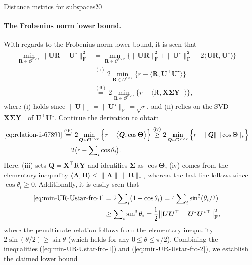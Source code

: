 \documentclass{article}
\begin{document}
\begin{problem}{Distance metrics for subspaces}{20}
{\paragraph{The Frobenius norm lower bound.}

With regards to the Frobenius norm lower bound, it is seen that
%
\begin{align}
\min_{\bm{R}\in\mathcal{O}^{r\times r}}\big\|\bm{U}\bm{R}-\bm{U}^{\star}\big\|_{\mathrm{F}}^{2} & =\min_{\bm{R}\in\mathcal{O}^{r\times r}}\Big\{\|\bm{U}\bm{R}\|_{\mathrm{F}}^{2}+\|\bm{U}^{\star}\|_{\mathrm{F}}^{2}-2\big\langle\bm{U}\bm{R},\bm{U}^{\star}\big\rangle\Big\}\nonumber \\
 & \overset{(\mathrm{i})}{=} 2\min_{\bm{R}\in\mathcal{O}^{r\times r}}\Big\{ r-\big\langle\bm{R},\bm{U}^{\top}\bm{U}^{\star}\big\rangle\Big\}\nonumber \\
 & \overset{(\mathrm{ii})}{=} 2\min_{\bm{R}\in\mathcal{O}^{r\times r}}\Big\{ r-\big\langle\bm{R},\bm{X}\bm{\Sigma}\bm{Y}^{\top}\big\rangle\Big\} ,
	\label{eq:relation-ii-67890}
\end{align}
%
where (i) holds since $\|\bm{U}\|_{\mathrm{F}}=\|\bm{U}^{\star}\|_{\mathrm{F}}=\sqrt{r}$,
and (ii) relies on the SVD $\bm{X}\bm{\Sigma}\bm{Y}^{\top}$ of $\bm{U}^{\top}\bm{U}^{\star}$.
Continue the derivation to obtain
%
\begin{align}
\eqref{eq:relation-ii-67890}
	& \overset{(\mathrm{iii})}{=}  2\min_{\bm{Q}\in\mathcal{O}^{r\times r}}\Big\{ r-\big\langle\bm{Q},\cos\bm{\Theta}\big\rangle\Big\}
	 \overset{(\mathrm{iv})}{\geq} 2\min_{\bm{Q}\in\mathcal{O}^{r\times r}}\Big\{ r-\|\bm{Q}\|\,\|\cos\bm{\Theta}\|_{*}\Big\}\nonumber \\
 & =2 \big( r-\sum\nolimits_{i}\cos\theta_{i}\big).\label{eq:min-UR-Ustar-fro-1}
\end{align}
%
Here, (iii) sets $\bm{Q}=\bm{X}^{\top}\bm{R}\bm{Y}$ and identifies
$\bm{\Sigma}$ as $\cos\bm{\Theta}$,
(iv) comes from the elementary inequality $\langle \bm{A}, \bm{B} \rangle \leq \|\bm{A}\|\,\|\bm{B}\|_*$,
whereas the last line follows
since $\cos\theta_{i}\geq0$. Additionally, it is easily seen that
%
\begin{align}
\eqref{eq:min-UR-Ustar-fro-1}
	& =2\sum\nolimits_{i} (1-\cos\theta_{i})=4\sum\nolimits_{i} \sin^{2}(\theta_{i}/2)\nonumber \\
 & \geq \sum\nolimits_{i} \sin^{2}\theta_{i}
  =\frac{1}{2} \big\Vert \bm{U}\bm{U}^{\top}-{\bm{U}}^{\star}{\bm{U}}^{\star\top}\big\Vert _{\mathrm{F}}^2 ,
	\label{eq:min-UR-Ustar-fro-2}
\end{align}
%
where the penultimate relation follows from the elementary inequality
$2\sin(\theta/2)\geq\sin\theta$ (which holds for any $0\leq\theta\leq\pi/2$).
Combining the inequalities (\ref{eq:min-UR-Ustar-fro-1}) and (\ref{eq:min-UR-Ustar-fro-2}),
we establish the claimed lower bound.




}


\end{problem}
\end{document}
